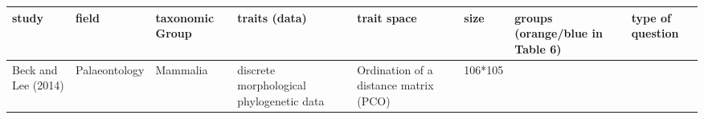 \documentclass[]{article}
\begin{document}
\begin{longtable}[]{@{}llllllll@{}}
\toprule
\begin{minipage}[b]{0.06\columnwidth}\raggedright\strut
study\strut
\end{minipage} & \begin{minipage}[b]{0.06\columnwidth}\raggedright\strut
field\strut
\end{minipage} & \begin{minipage}[b]{0.14\columnwidth}\raggedright\strut
taxonomic Group\strut
\end{minipage} & \begin{minipage}[b]{0.13\columnwidth}\raggedright\strut
traits (data)\strut
\end{minipage} & \begin{minipage}[b]{0.11\columnwidth}\raggedright\strut
trait space\strut
\end{minipage} & \begin{minipage}[b]{0.06\columnwidth}\raggedright\strut
size\strut
\end{minipage} & \begin{minipage}[b]{0.07\columnwidth}\raggedright\strut
groups (orange/blue in Table 6)\strut
\end{minipage} & \begin{minipage}[b]{0.15\columnwidth}\raggedright\strut
type of question\strut
\end{minipage}\tabularnewline
\midrule
\endhead
\begin{minipage}[t]{0.06\columnwidth}\raggedright\strut
Beck and Lee (2014)\strut
\end{minipage} & \begin{minipage}[t]{0.06\columnwidth}\raggedright\strut
Palaeontology\strut
\end{minipage} & \begin{minipage}[t]{0.14\columnwidth}\raggedright\strut
Mammalia\strut
\end{minipage} & \begin{minipage}[t]{0.13\columnwidth}\raggedright\strut
discrete morphological phylogenetic data\strut
\end{minipage} & \begin{minipage}[t]{0.11\columnwidth}\raggedright\strut
Ordination of a distance matrix (PCO)\strut
\end{minipage} & \begin{minipage}[t]{0.06\columnwidth}\raggedright\strut
106*105\strut
\end{minipage} & \begin{minipage}[t]{0.07\columnwidth}\raggedright\strut

\end{minipage}
\end{longtable}
\end{document}
